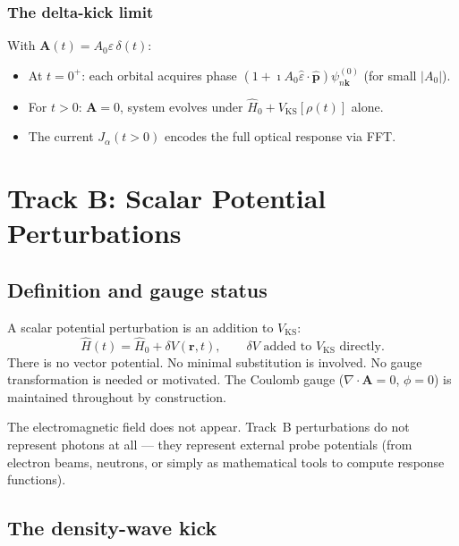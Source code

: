 \documentclass[11pt]{article}
\newcommand{\iunit}{\imath}
\newcommand{\Avec}{\mathbf{A}}
\newcommand{\phat}{\hat{\mathbf{p}}}
\newcommand{\VKS}{V_{\mathrm{KS}}}
\begin{document}
\subsubsection{The delta-kick limit}

With $\Avec(t)=A_0\hat{\varepsilon}\,\delta(t)$:
\begin{itemize}
  \item At $t=0^+$: each orbital acquires phase
    $(1+\iunit A_0\hat{\varepsilon}\cdot\phat)\psi_{n\mathbf{k}}^{(0)}$
    (for small $|A_0|$).
  \item For $t>0$: $\Avec=0$, system evolves under
    $\hat{H}_0+\VKS[\rho(t)]$ alone.
  \item The current $J_\alpha(t>0)$ encodes the full optical
    response via FFT.
\end{itemize}

\section{Track B: Scalar Potential Perturbations}

\subsection{Definition and gauge status}

A scalar potential perturbation is an addition to $\VKS$:
\begin{equation}
  \hat{H}(t)
  = \hat{H}_0 + \delta V(\mathbf{r},t),
  \qquad
  \delta V \text{ added to } \VKS \text{ directly.}
  \label{eq:Track-B}
\end{equation}
There is no vector potential.
No minimal substitution is involved.
No gauge transformation is needed or motivated.
The Coulomb gauge ($\nabla\cdot\Avec=0$, $\phi=0$) is maintained
throughout by construction.

The electromagnetic field does not appear.
Track~B perturbations do not represent photons at all --- they
represent external probe potentials (from electron beams, neutrons,
or simply as mathematical tools to compute response functions).

\subsection{The density-wave kick}
\end{document}
